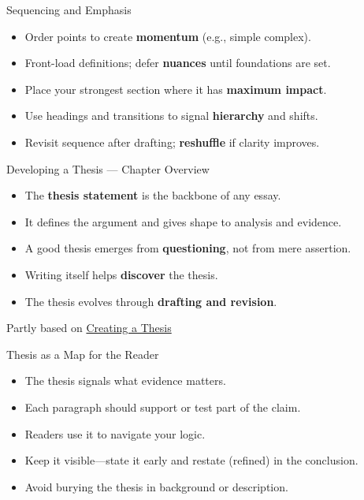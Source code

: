 \documentclass[aspectratio=169]{beamer}
\begin{document}
\begin{frame}{Sequencing and Emphasis}
\begin{itemize}
  \item Order points to create \textbf{momentum} (e.g., simple \textrightarrow{} complex).
  \item Front-load definitions; defer \textbf{nuances} until foundations are set.
  \item Place your strongest section where it has \textbf{maximum impact}.
  \item Use headings and transitions to signal \textbf{hierarchy} and shifts.
  \item Revisit sequence after drafting; \textbf{reshuffle} if clarity improves.
\end{itemize}
\end{frame}

\begin{frame}{Developing a Thesis — Chapter Overview}
\begin{itemize}
  \item The \textbf{thesis statement} is the backbone of any essay.
  \item It defines the argument and gives shape to analysis and evidence.
  \item A good thesis emerges from \textbf{questioning}, not from mere assertion.
  \item Writing itself helps \textbf{discover} the thesis.
  \item The thesis evolves through \textbf{drafting and revision}.
\end{itemize}

\vfill

Partly based on \href{https://mlpp.pressbooks.pub/writinghandbook/chapter/44/}{Creating a Thesis} \citep[Ch.~3]{writinghandbook}

\end{frame}

\begin{frame}{Thesis as a Map for the Reader}
\begin{itemize}
  \item The thesis signals what evidence matters.
  \item Each paragraph should support or test part of the claim.
  \item Readers use it to navigate your logic.
  \item Keep it visible—state it early and restate (refined) in the conclusion.
  \item Avoid burying the thesis in background or description.
\end{itemize}
\end{frame}
\end{document}
